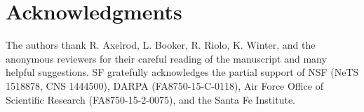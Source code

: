 \documentclass{sig-alternate}
\begin{document}

\section{Acknowledgments}

The authors thank R. Axelrod, L. Booker, R. Riolo, K. Winter, and the anonymous
reviewers for their careful reading of the manuscript and many helpful
suggestions.  SF gratefully acknowledges the partial support of NSF
(NeTS 1518878, CNS 1444500), DARPA (FA8750-15-C-0118), 
Air Force Office of Scientific Research (FA8750-15-2-0075), and the Santa Fe Institute.




\end{document}
